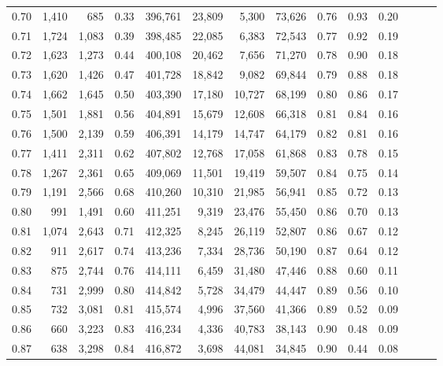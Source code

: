 \begin{tabular}{rrrrrrrrrrrrrr}
0.70 &   1,410 &    685 &  0.33 &  396,761 &   23,809 &   5,300 &  73,626 &  0.76 &  0.93 &      0.20 \\
0.71 &   1,724 &  1,083 &  0.39 &  398,485 &   22,085 &   6,383 &  72,543 &  0.77 &  0.92 &      0.19 \\
0.72 &   1,623 &  1,273 &  0.44 &  400,108 &   20,462 &   7,656 &  71,270 &  0.78 &  0.90 &      0.18 \\
0.73 &   1,620 &  1,426 &  0.47 &  401,728 &   18,842 &   9,082 &  69,844 &  0.79 &  0.88 &      0.18 \\
0.74 &   1,662 &  1,645 &  0.50 &  403,390 &   17,180 &  10,727 &  68,199 &  0.80 &  0.86 &      0.17 \\
0.75 &   1,501 &  1,881 &  0.56 &  404,891 &   15,679 &  12,608 &  66,318 &  0.81 &  0.84 &      0.16 \\
0.76 &   1,500 &  2,139 &  0.59 &  406,391 &   14,179 &  14,747 &  64,179 &  0.82 &  0.81 &      0.16 \\
0.77 &   1,411 &  2,311 &  0.62 &  407,802 &   12,768 &  17,058 &  61,868 &  0.83 &  0.78 &      0.15 \\
0.78 &   1,267 &  2,361 &  0.65 &  409,069 &   11,501 &  19,419 &  59,507 &  0.84 &  0.75 &      0.14 \\
0.79 &   1,191 &  2,566 &  0.68 &  410,260 &   10,310 &  21,985 &  56,941 &  0.85 &  0.72 &      0.13 \\
0.80 &     991 &  1,491 &  0.60 &  411,251 &    9,319 &  23,476 &  55,450 &  0.86 &  0.70 &      0.13 \\
0.81 &   1,074 &  2,643 &  0.71 &  412,325 &    8,245 &  26,119 &  52,807 &  0.86 &  0.67 &      0.12 \\
0.82 &     911 &  2,617 &  0.74 &  413,236 &    7,334 &  28,736 &  50,190 &  0.87 &  0.64 &      0.12 \\
0.83 &     875 &  2,744 &  0.76 &  414,111 &    6,459 &  31,480 &  47,446 &  0.88 &  0.60 &      0.11 \\
0.84 &     731 &  2,999 &  0.80 &  414,842 &    5,728 &  34,479 &  44,447 &  0.89 &  0.56 &      0.10 \\
0.85 &     732 &  3,081 &  0.81 &  415,574 &    4,996 &  37,560 &  41,366 &  0.89 &  0.52 &      0.09 \\
0.86 &     660 &  3,223 &  0.83 &  416,234 &    4,336 &  40,783 &  38,143 &  0.90 &  0.48 &      0.09 \\
0.87 &     638 &  3,298 &  0.84 &  416,872 &    3,698 &  44,081 &  34,845 &  0.90 &  0.44 &      0.08 \\

\end{tabular}
